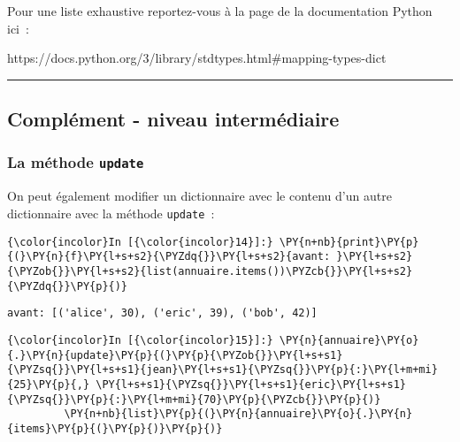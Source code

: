     Pour une liste exhaustive reportez-vous à la page de la documentation
Python ici~:

https://docs.python.org/3/library/stdtypes.html\#mapping-types-dict

    \begin{center}\rule{0.5\linewidth}{\linethickness}\end{center}

    \hypertarget{compluxe9ment---niveau-intermuxe9diaire}{%
\subsection{Complément - niveau
intermédiaire}\label{compluxe9ment---niveau-intermuxe9diaire}}

    \hypertarget{la-muxe9thode-update}{%
\subsubsection{\texorpdfstring{La méthode
\texttt{update}}{La méthode update}}\label{la-muxe9thode-update}}

    On peut également modifier un dictionnaire avec le contenu d'un autre
dictionnaire avec la méthode \texttt{update}~:

    \begin{Verbatim}[commandchars=\\\{\}]
{\color{incolor}In [{\color{incolor}14}]:} \PY{n+nb}{print}\PY{p}{(}\PY{n}{f}\PY{l+s+s2}{\PYZdq{}}\PY{l+s+s2}{avant: }\PY{l+s+s2}{\PYZob{}}\PY{l+s+s2}{list(annuaire.items())\PYZcb{}}\PY{l+s+s2}{\PYZdq{}}\PY{p}{)}
\end{Verbatim}


    \begin{Verbatim}[commandchars=\\\{\}]
avant: [('alice', 30), ('eric', 39), ('bob', 42)]

    \end{Verbatim}

    \begin{Verbatim}[commandchars=\\\{\}]
{\color{incolor}In [{\color{incolor}15}]:} \PY{n}{annuaire}\PY{o}{.}\PY{n}{update}\PY{p}{(}\PY{p}{\PYZob{}}\PY{l+s+s1}{\PYZsq{}}\PY{l+s+s1}{jean}\PY{l+s+s1}{\PYZsq{}}\PY{p}{:}\PY{l+m+mi}{25}\PY{p}{,} \PY{l+s+s1}{\PYZsq{}}\PY{l+s+s1}{eric}\PY{l+s+s1}{\PYZsq{}}\PY{p}{:}\PY{l+m+mi}{70}\PY{p}{\PYZcb{}}\PY{p}{)}
         \PY{n+nb}{list}\PY{p}{(}\PY{n}{annuaire}\PY{o}{.}\PY{n}{items}\PY{p}{(}\PY{p}{)}\PY{p}{)}
\end{Verbatim}


